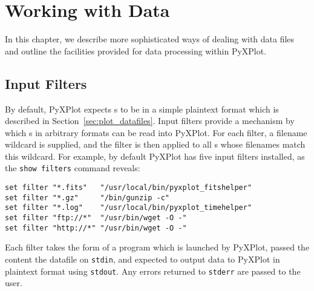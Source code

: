 %
%
%
%
%



\chapter{Working with Data}
\label{ch:numerics}

In this chapter, we describe more sophisticated ways of dealing with data files
and outline the facilities provided for data processing within PyXPlot.

\section{Input Filters}
\label{sec:filters}

By default, PyXPlot expects \datafile s to be in a simple plaintext format
which is described in Section~\ref{sec:plot_datafiles}. Input filters provide a
mechanism by which \datafile s in arbitrary formats can be read into PyXPlot.
For each filter, a filename wildcard is supplied, and the filter is then applied to
all \datafile s whose filenames match this wildcard. For example, by default
PyXPlot has five input filters installed, as the {\tt show filters} command
reveals:

\begin{verbatim}
set filter "*.fits"   "/usr/local/bin/pyxplot_fitshelper"
set filter "*.gz"     "/bin/gunzip -c"
set filter "*.log"    "/usr/local/bin/pyxplot_timehelper"
set filter "ftp://*"  "/usr/bin/wget -O -"
set filter "http://*" "/usr/bin/wget -O -"
\end{verbatim}

Each filter takes the form of a program which is launched by PyXPlot, passed
the content the datafile on {\tt stdin}, and expected to output data to PyXPlot
in plaintext format using {\tt stdout}. Any errors returned to {\tt stderr} are
passed to the user.

